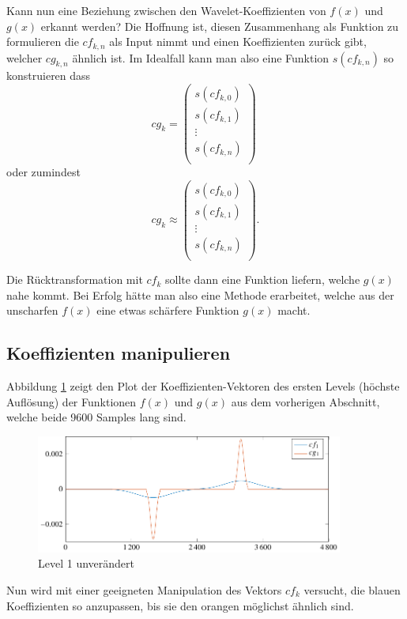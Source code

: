 Kann nun eine Beziehung zwischen den Wavelet-Koeffizienten von $f(x)$ und $g(x)$ erkannt werden?
Die Hoffnung ist, diesen Zusammenhang als Funktion zu formulieren die $cf_{k,n}$ als Input nimmt und einen Koeffizienten zurück gibt, welcher $cg_{k,n}$ ähnlich ist.
Im Idealfall kann man also eine Funktion $s(cf_{k,n})$ so konstruieren dass
$$cg_k = \left(\begin{array}{c}
	s(cf_{k,0})\\
	s(cf_{k,1})\\
	\vdots\\
	s(cf_{k,n})\\
\end{array} \right)\phantom{.}$$
oder zumindest
$$cg_k \approx \left(\begin{array}{c}
	s(cf_{k,0})\\
	s(cf_{k,1})\\
	\vdots\\
	s(cf_{k,n})\\
\end{array} \right).$$

Die Rücktransformation mit $cf_k$ sollte dann eine Funktion liefern, welche $g(x)$ nahe kommt.
Bei Erfolg hätte man also eine Methode erarbeitet, welche aus der \glqq unscharfen\grqq{} $f(x)$ eine etwas \glqq schärfere\grqq{} Funktion $g(x)$ macht. 

\subsection{Koeffizienten manipulieren}
Abbildung \ref{deconvolve:level1} zeigt den Plot der Koeffizienten-Vektoren des ersten Levels (höchste Auflösung) der Funktionen $f(x)$ und $g(x)$ aus dem vorherigen Abschnitt, welche beide 9600 Samples lang sind.
\begin{figure}
\centering
\includegraphics[width=0.9\textwidth]{./papers/deconvolve/pictures/level/level1.pdf}
\caption{Level 1 unverändert\label{deconvolve:level1}}
\end{figure}

Nun wird mit einer geeigneten Manipulation des Vektors $cf_k$ versucht, die blauen Koeffizienten so anzupassen, bis sie den orangen möglichst ähnlich sind.

